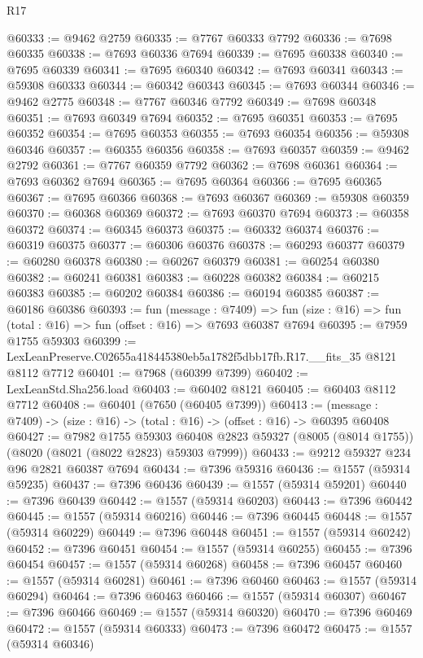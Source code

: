 \begin{lexlean}{R17}
\begin{coremodule}
@60333 := @9462 @2759
@60335 := @7767 @60333 @7792
@60336 := @7698 @60335
@60338 := @7693 @60336 @7694
@60339 := @7695 @60338
@60340 := @7695 @60339
@60341 := @7695 @60340
@60342 := @7693 @60341
@60343 := @59308 @60333
@60344 := @60342 @60343
@60345 := @7693 @60344
@60346 := @9462 @2775
@60348 := @7767 @60346 @7792
@60349 := @7698 @60348
@60351 := @7693 @60349 @7694
@60352 := @7695 @60351
@60353 := @7695 @60352
@60354 := @7695 @60353
@60355 := @7693 @60354
@60356 := @59308 @60346
@60357 := @60355 @60356
@60358 := @7693 @60357
@60359 := @9462 @2792
@60361 := @7767 @60359 @7792
@60362 := @7698 @60361
@60364 := @7693 @60362 @7694
@60365 := @7695 @60364
@60366 := @7695 @60365
@60367 := @7695 @60366
@60368 := @7693 @60367
@60369 := @59308 @60359
@60370 := @60368 @60369
@60372 := @7693 @60370 @7694
@60373 := @60358 @60372
@60374 := @60345 @60373
@60375 := @60332 @60374
@60376 := @60319 @60375
@60377 := @60306 @60376
@60378 := @60293 @60377
@60379 := @60280 @60378
@60380 := @60267 @60379
@60381 := @60254 @60380
@60382 := @60241 @60381
@60383 := @60228 @60382
@60384 := @60215 @60383
@60385 := @60202 @60384
@60386 := @60194 @60385
@60387 := @60186 @60386
@60393 := fun (message : @7409) =>
  fun (size : @16) => fun (total : @16) => fun (offset : @16) => @7693 @60387 @7694
@60395 := @7959 @1755 @59303
@60399 := LexLeanPreserve.C02655a418445380eb5a1782f5dbb17fb.R17.__fits_35 @8121 @8112 @7712
@60401 := @7968 (@60399 @7399)
@60402 := LexLeanStd.Sha256.load
@60403 := @60402 @8121
@60405 := @60403 @8112 @7712
@60408 := @60401 (@7650 (@60405 @7399))
@60413 := (message : @7409) -> (size : @16) -> (total : @16) -> (offset : @16) -> @60395 @60408
@60427 := @7982
    @1755
    @59303
    @60408
    @2823
    @59327
    (@8005 (@8014 @1755))
    (@8020 (@8021 (@8022 @2823) @59303 @7999))
@60433 := @9212 @59327 @234 @96 @2821 @60387 @7694
@60434 := @7396 @59316
@60436 := @1557 (@59314 @59235)
@60437 := @7396 @60436
@60439 := @1557 (@59314 @59201)
@60440 := @7396 @60439
@60442 := @1557 (@59314 @60203)
@60443 := @7396 @60442
@60445 := @1557 (@59314 @60216)
@60446 := @7396 @60445
@60448 := @1557 (@59314 @60229)
@60449 := @7396 @60448
@60451 := @1557 (@59314 @60242)
@60452 := @7396 @60451
@60454 := @1557 (@59314 @60255)
@60455 := @7396 @60454
@60457 := @1557 (@59314 @60268)
@60458 := @7396 @60457
@60460 := @1557 (@59314 @60281)
@60461 := @7396 @60460
@60463 := @1557 (@59314 @60294)
@60464 := @7396 @60463
@60466 := @1557 (@59314 @60307)
@60467 := @7396 @60466
@60469 := @1557 (@59314 @60320)
@60470 := @7396 @60469
@60472 := @1557 (@59314 @60333)
@60473 := @7396 @60472
@60475 := @1557 (@59314 @60346)

\end{coremodule}
\end{lexlean}
